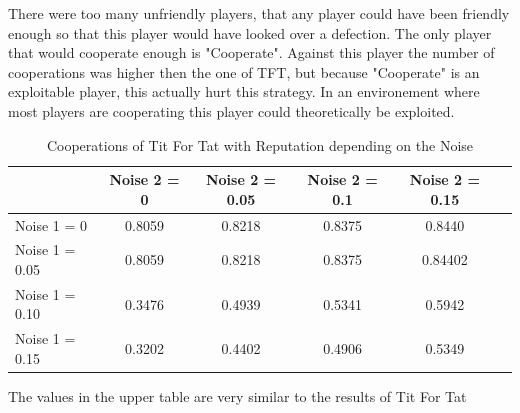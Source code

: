 There were too many unfriendly players, that any player could have been friendly enough so that this player would have looked over a defection. The only player that would cooperate enough is "Cooperate". Against this player the number of cooperations was higher then the one of TFT, but because "Cooperate" is an exploitable player, this actually hurt this strategy.
In an environement where most players are cooperating this player could theoretically be exploited.

\begin{table}[h]
 \begin{center}
\caption{Cooperations of Tit For Tat with Reputation depending on the Noise} \vspace{3mm}
\begin{tabular}{|l|c|c|c|c|c|}
\hline
   	& Noise 2 = 0 & Noise 2 = 0.05& Noise 2 = 0.1& Noise 2 = 0.15 \\
  \hline
  Noise 1 = 0 	&           0.8059  & 0.8218&    0.8375   & 0.8440 \\
 \hline
  Noise 1 = 0.05	 &     0.8059  &  0.8218 &   0.8375   & 0.84402 \\
 \hline
  Noise 1 = 0.10 	&     0.3476  &  0.4939  &  0.5341  &  0.5942 \\
 \hline
  Noise 1 = 0.15 	&    0.3202 &   0.4402 &   0.4906 &   0.5349 \\
 \hline
\end{tabular}
 \end{center}
\end{table}

The values in the upper table are very similar to the results of Tit For Tat

\newpage
